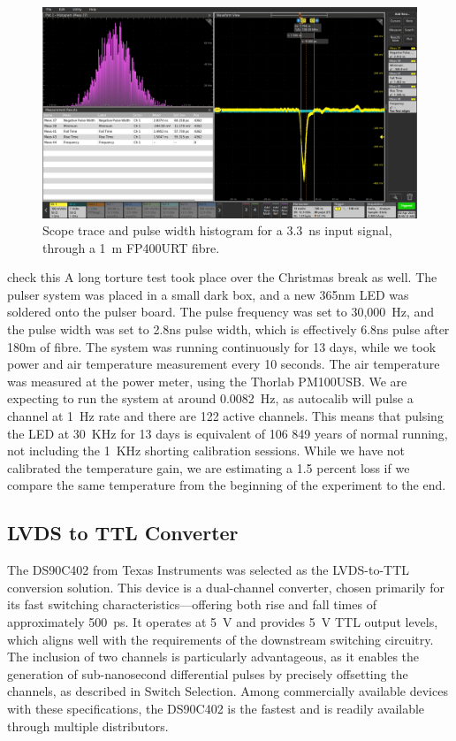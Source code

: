 \documentclass[a4paper,11pt]{article}
\begin{document}
\begin{figure}[h]
\centering
\includegraphics[width=\textwidth]{1LargePulse}
\caption{Scope trace and pulse width histogram for a 3.3~ns input signal, through a 1~m FP400URT fibre.}\label{fig:1LargePulse}
\end{figure}

{\color{red} check this}
A long torture test took place over the Christmas break as well. The pulser system was placed in a small dark box, and a new 365nm LED was soldered onto the pulser board. The pulse frequency was set to 30,000~Hz, and the pulse width was set to 2.8ns pulse width, which is effectively 6.8ns pulse after 180m of fibre. The system was running continuously for 13 days, while we took power and air temperature measurement every 10 seconds. The air temperature was measured at the power meter, using the Thorlab PM100USB. We are expecting to run the system at around 0.0082~Hz, as autocalib will pulse a channel at 1~Hz rate and there are 122 active channels. This means that pulsing the LED at 30~KHz for 13 days is equivalent of 106 849 years of normal running, not including the 1~KHz shorting calibration sessions. While we have not calibrated the temperature gain, we are estimating a 1.5 percent loss if we compare the same temperature from the beginning of the experiment to the end. %



\subsection{LVDS to TTL Converter}

The DS90C402 \cite{DS90C402} from Texas Instruments was selected as the LVDS-to-TTL conversion solution. This device is a dual-channel converter, chosen primarily for its fast switching characteristics—offering both rise and fall times of approximately 500~ps. It operates at 5~V and provides 5~V TTL output levels, which aligns well with the requirements of the downstream switching circuitry. The inclusion of two channels is particularly advantageous, as it enables the generation of sub-nanosecond differential pulses by precisely offsetting the channels, as described in Switch Selection. Among commercially available devices with these specifications, the DS90C402 is the fastest and is readily available through multiple distributors.
\end{document}
